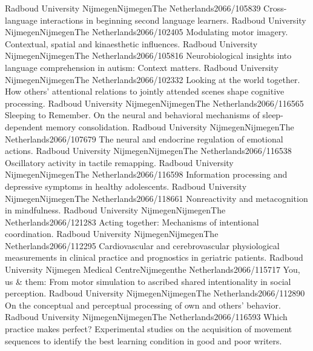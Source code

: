 	{Radboud University Nijmegen}{Nijmegen}{The Netherlands}{2066/105839}
	{Cross-language interactions in beginning second language learners.}
	{Radboud University Nijmegen}{Nijmegen}{The Netherlands}{2066/102405}
	{Modulating motor imagery. Contextual, spatial and kinaesthetic influences.}
	{Radboud University Nijmegen}{Nijmegen}{The Netherlands}{2066/105816}
	{Neurobiological insights into language comprehension in autism: Context matters.}
	{Radboud University Nijmegen}{Nijmegen}{The Netherlands}{2066/102332}
	{Looking at the world together. How others' attentional relations to jointly attended scenes shape cognitive processing.}
	{Radboud University Nijmegen}{Nijmegen}{The Netherlands}{2066/116565}
	{Sleeping to Remember. On the neural and behavioral mechanisms of sleep-dependent memory consolidation.}
	{Radboud University Nijmegen}{Nijmegen}{The Netherlands}{2066/107679}
	{The neural and endocrine regulation of emotional actions.}
	{Radboud University Nijmegen}{Nijmegen}{The Netherlands}{2066/116538}
	{Oscillatory activity in tactile remapping.}
	{Radboud University Nijmegen}{Nijmegen}{The Netherlands}{2066/116598}
	{Information processing and depressive symptoms in healthy adolescents.}
	{Radboud University Nijmegen}{Nijmegen}{The Netherlands}{2066/118661}
	{Nonreactivity and metacognition in mindfulness.}
	{Radboud University Nijmegen}{Nijmegen}{The Netherlands}{2066/121283}
	{Acting together: Mechanisms of intentional coordination.}
	{Radboud University Nijmegen}{Nijmegen}{The Netherlands}{2066/112295}
	{Cardiovascular and cerebrovascular physiological measurements in clinical practice and prognostics in geriatric patients.}
	{Radboud University Nijmegen Medical Centre}{Nijmegen}{the Netherlands}{2066/115717}
	{ You, us \& them: From motor simulation to ascribed shared intentionality in social perception.}
	{Radboud University Nijmegen}{Nijmegen}{The Netherlands}{2066/112890}
	{On the conceptual and perceptual processing of own and others' behavior.}
	{Radboud University Nijmegen}{Nijmegen}{The Netherlands}{2066/116593}
	{Which practice makes perfect? Experimental studies on the acquisition of movement sequences to identify the best learning condition in good and poor writers.}
